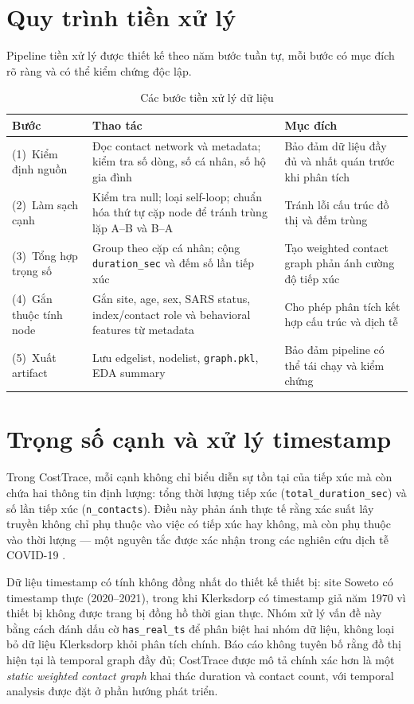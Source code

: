 \documentclass[12pt,a4paper]{report}
\theoremstyle{definition}
\begin{document}
\section{Quy trình tiền xử lý}

Pipeline tiền xử lý được thiết kế theo năm bước tuần tự, mỗi bước có mục đích rõ ràng và có thể kiểm chứng độc lập.

\begin{table}[H]
\centering
\caption{Các bước tiền xử lý dữ liệu}
\label{tab:preprocessing}
\begin{tabularx}{\textwidth}{L{3.2cm} Y Y}
\toprule
\textbf{Bước} & \textbf{Thao tác} & \textbf{Mục đích}\\
\midrule
(1)~Kiểm định nguồn  & Đọc contact network và metadata; kiểm tra số dòng, số cá nhân, số hộ gia đình & Bảo đảm dữ liệu đầy đủ và nhất quán trước khi phân tích\\[4pt]
(2)~Làm sạch cạnh    & Kiểm tra null; loại self-loop; chuẩn hóa thứ tự cặp node để tránh trùng lặp A--B và B--A & Tránh lỗi cấu trúc đồ thị và đếm trùng\\[4pt]
(3)~Tổng hợp trọng số & Group theo cặp cá nhân; cộng \texttt{duration\_sec} và đếm số lần tiếp xúc & Tạo weighted contact graph phản ánh cường độ tiếp xúc\\[4pt]
(4)~Gắn thuộc tính node & Gắn site, age, sex, SARS status, index/contact role và behavioral features từ metadata & Cho phép phân tích kết hợp cấu trúc và dịch tễ\\[4pt]
(5)~Xuất artifact     & Lưu edgelist, nodelist, \texttt{graph.pkl}, EDA summary & Bảo đảm pipeline có thể tái chạy và kiểm chứng\\
\bottomrule
\end{tabularx}
\end{table}

\section{Trọng số cạnh và xử lý timestamp}

Trong CostTrace, mỗi cạnh không chỉ biểu diễn sự tồn tại của tiếp xúc mà còn chứa hai thông tin định lượng: tổng thời lượng tiếp xúc (\texttt{total\_duration\_sec}) và số lần tiếp xúc (\texttt{n\_contacts}). Điều này phản ánh thực tế rằng xác suất lây truyền không chỉ phụ thuộc vào việc có tiếp xúc hay không, mà còn phụ thuộc vào thời lượng --- một nguyên tắc được xác nhận trong các nghiên cứu dịch tễ COVID-19 \cite{adam2020}.

Dữ liệu timestamp có tính không đồng nhất do thiết kế thiết bị: site Soweto có timestamp thực (2020--2021), trong khi Klerksdorp có timestamp giả năm 1970 vì thiết bị không được trang bị đồng hồ thời gian thực. Nhóm xử lý vấn đề này bằng cách đánh dấu cờ \texttt{has\_real\_ts} để phân biệt hai nhóm dữ liệu, không loại bỏ dữ liệu Klerksdorp khỏi phân tích chính. Báo cáo không tuyên bố rằng đồ thị hiện tại là temporal graph đầy đủ; CostTrace được mô tả chính xác hơn là một \textit{static weighted contact graph} khai thác duration và contact count, với temporal analysis được đặt ở phần hướng phát triển.
\end{document}

